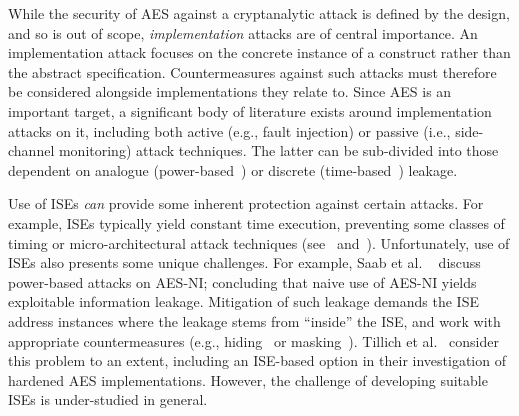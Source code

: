 
While the security of AES against a cryptanalytic attack is defined by
the design, and so is out of scope, {\em implementation} attacks are
of central importance.
An implementation attack focuses on the concrete instance of a construct
rather than the abstract specification.
Countermeasures against such attacks must therefore be
considered alongside implementations they relate to.
Since AES is an important target, a significant body of literature exists
around implementation attacks on it, including both
 active (e.g., fault injection)
or
passive (i.e., side-channel monitoring)
attack techniques.
The latter can be sub-divided into those dependent on
analogue
(power-based~\cite{ManOswPop:07})
or
discrete 
(time-based~\cite{KoeQui:99})
leakage.

Use of ISEs
{\em can} provide some inherent protection against certain attacks.
For example,
ISEs typically yield constant time execution,
preventing some classes of timing or micro-architectural
attack techniques
(see~\cite[Section 4]{Szefer:19} and~\cite[Section 4]{GYCH:18}).
Unfortunately,
use of ISEs also presents some unique challenges.
For example, 
Saab et al. ~\cite{SaaRohHam:16}
discuss power-based attacks on AES-NI; concluding
that naive use of AES-NI yields exploitable information leakage.
Mitigation of such leakage demands the ISE
address instances where the leakage stems from ``inside'' the ISE,
and work with appropriate countermeasures
(e.g., hiding~\cite[Chapter 7]{ManOswPop:07} or masking~\cite[Chapter 10]{ManOswPop:07}).
Tillich et al.~\cite{TilHerMan:07}
consider this problem to an extent, including an ISE-based option in
their investigation of hardened AES implementations. However, the challenge
of developing suitable ISEs is under-studied in general.

